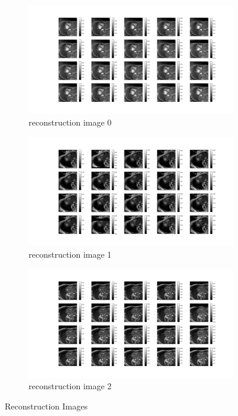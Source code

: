 \documentclass{article}
\begin{document}
\begin{figure}[ht]
  \centering
  \begin{subfigure}[b]{0.8\linewidth}
    \includegraphics[width=\linewidth]{../images/No_opt/reconstruction/reconstruction_0.png}
    \caption{reconstruction image 0}
  \end{subfigure}
  \quad
  \begin{subfigure}[b]{0.8\linewidth}
    \includegraphics[width=\linewidth]{../images/No_opt/reconstruction/reconstruction_1.png}
    \caption{reconstruction image 1}
  \end{subfigure}
  \quad
  \begin{subfigure}[b]{0.8\linewidth}
    \includegraphics[width=\linewidth]{../images/No_opt/reconstruction/reconstruction_2.png}
    \caption{reconstruction image 2}
  \end{subfigure}
  \caption{Reconstruction Images}
\end{figure}
\end{document}
